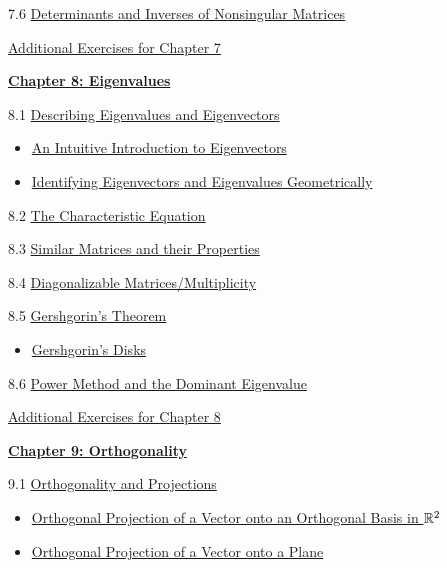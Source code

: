 \documentclass{ximera}
\begin{document}
7.6	\href{https://ximera.osu.edu/oerlinalg/LinearAlgebra/DET-0060/main}{Determinants and Inverses of Nonsingular Matrices}
	
\href{https://ximera.osu.edu/oerlinalg/LinearAlgebra/SUPX-0070/main}{Additional Exercises for Chapter 7}
	
\href{https://ximera.osu.edu/oerlinalg/LinearAlgebra/XLAChapter_eigenvalues/main}{\textbf{Chapter 8: Eigenvalues}}
	
8.1	\href{https://ximera.osu.edu/oerlinalg/LinearAlgebra/EIG-0010/main}{Describing Eigenvalues and Eigenvectors}
\begin{itemize}
    \item 
    \href{https://www.geogebra.org/m/ub4kqvmz}{An Intuitive Introduction to Eigenvectors}
    \item
    \href{https://www.geogebra.org/m/vd3fydmg}{Identifying Eigenvectors and Eigenvalues Geometrically}
\end{itemize}
	
8.2	\href{https://ximera.osu.edu/oerlinalg/LinearAlgebra/EIG-0020/main}{The Characteristic Equation}
	
8.3	\href{https://ximera.osu.edu/oerlinalg/LinearAlgebra/EIG-0040/main}{Similar Matrices and their Properties}
	
8.4	\href{https://ximera.osu.edu/oerlinalg/LinearAlgebra/EIG-0050/main}{Diagonalizable Matrices/Multiplicity}
	
8.5	\href{https://ximera.osu.edu/oerlinalg/LinearAlgebra/EIG-0080/main}{Gershgorin's Theorem}
\begin{itemize}
    \item 
    \href{https://www.geogebra.org/m/jrpqazq4}{Gershgorin's Disks}
\end{itemize}
	
8.6	\href{https://ximera.osu.edu/oerlinalg/LinearAlgebra/EIG-0070/main}{Power Method and the Dominant Eigenvalue}
	
\href{https://ximera.osu.edu/oerlinalg/LinearAlgebra/SUPX-0080/main}{Additional Exercises for Chapter 8}
	
\href{https://ximera.osu.edu/oerlinalg/LinearAlgebra/XLAChapter_orthogonality/main}{\textbf{Chapter 9: Orthogonality}}
	
9.1	\href{https://ximera.osu.edu/oerlinalg/LinearAlgebra/RTH-0010/main}{Orthogonality and Projections}
\begin{itemize}
    \item 
    \href{https://www.geogebra.org/m/nsqzhsxv}{Orthogonal Projection of a Vector onto an Orthogonal Basis in $\mathbb{R}^2$}
   \item
   \href{https://www.geogebra.org/m/hehqyayz}{Orthogonal Projection of a Vector onto a Plane}
\end{itemize}
	
\end{document}
